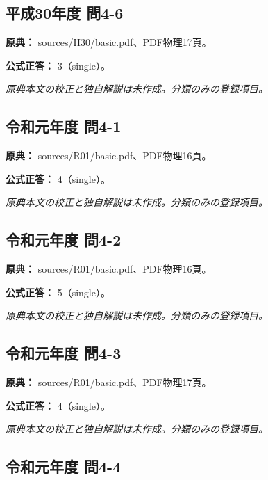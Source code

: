 \subsection{平成30年度 問4-6}
\label{q:h30-reg-basic-4-6}

\noindent\textbf{原典：} sources/H30/basic.pdf、PDF物理17頁。

\textbf{公式正答：} 3（single）。

\par\textit{原典本文の校正と独自解説は未作成。分類のみの登録項目。}

\subsection{令和元年度 問4-1}
\label{q:r01-reg-basic-4-1}

\noindent\textbf{原典：} sources/R01/basic.pdf、PDF物理16頁。

\textbf{公式正答：} 4（single）。

\par\textit{原典本文の校正と独自解説は未作成。分類のみの登録項目。}

\subsection{令和元年度 問4-2}
\label{q:r01-reg-basic-4-2}

\noindent\textbf{原典：} sources/R01/basic.pdf、PDF物理16頁。

\textbf{公式正答：} 5（single）。

\par\textit{原典本文の校正と独自解説は未作成。分類のみの登録項目。}

\subsection{令和元年度 問4-3}
\label{q:r01-reg-basic-4-3}

\noindent\textbf{原典：} sources/R01/basic.pdf、PDF物理17頁。

\textbf{公式正答：} 4（single）。

\par\textit{原典本文の校正と独自解説は未作成。分類のみの登録項目。}

\subsection{令和元年度 問4-4}
\label{q:r01-reg-basic-4-4}

